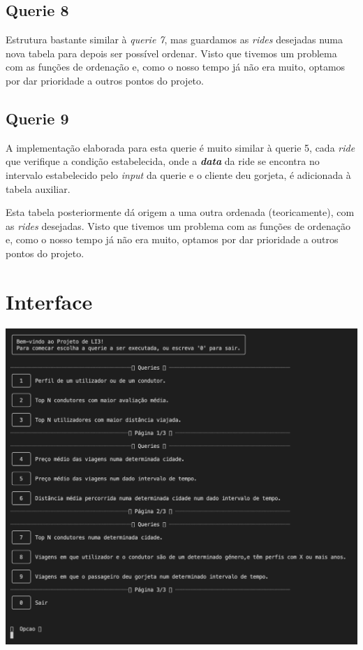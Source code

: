 \documentclass[12pt,a4paper]{article}
\begin{document}
\subsection{Querie 8}
    \par Estrutura bastante similar à \textit{querie 7}, mas guardamos as \textit{rides} desejadas numa nova tabela para depois ser possível ordenar. Visto que tivemos um problema com as funções de ordenação e, como o nosso tempo já não era muito, optamos por dar prioridade a outros pontos do projeto.
    
\subsection{Querie 9}
    \par A implementação elaborada para esta querie é muito similar à querie 5, cada \textit{ride} que verifique a condição estabelecida, onde a \textit{\textbf{data}} da ride se encontra no intervalo estabelecido pelo \textit{input} da querie e o cliente deu gorjeta, é adicionada à tabela auxiliar.
    \par Esta tabela posteriormente dá origem a uma outra ordenada (teoricamente), com as \textit{rides} desejadas. Visto que tivemos um problema com as funções de ordenação e, como o nosso tempo já não era muito, optamos por dar prioridade a outros pontos do projeto. 
\clearpage

\section{Interface}
\includegraphics[width=1\textwidth]{imagens/fotos/Interface.png}
\end{document}
